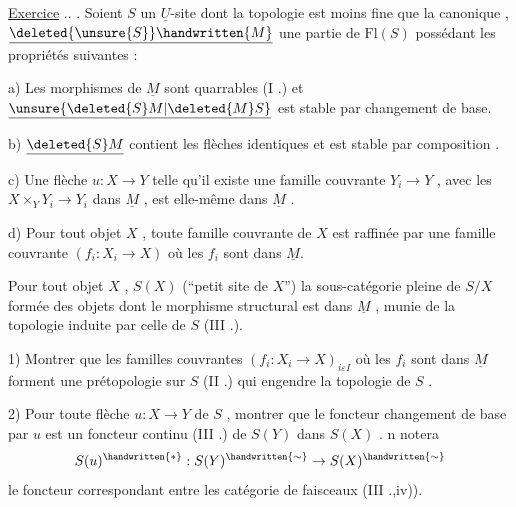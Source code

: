 \uline{Exercice} .. . Soient \(S\) un \(\underline{U}\)-site dont la topologie est moins fine que la canonique , \(\underline{\deleted{\unsure{S}}\handwritten{M}}\) une partie de \(\mathrm{Fl}(S)\) possédant les propriétés suivantes :

a) Les morphismes de \(\underline{M}\) sont quarrables (I .) et \(\underline{\unsure{\deleted{S}M|\deleted{M}S}}\) est stable par changement de base.

b) \(\underline{\deleted{S}M}\) contient les flèches identiques et est stable par composition .

c) Une flèche \(u:X\to Y\) telle qu'il existe une famille couvrante \(Y_i\to Y\) , avec les \(X\times_Y Y_i\to Y_i\) dans \(\underline{M}\) , est elle-même dans \(\underline{M}\) .

d) Pour tout objet \(X\) , toute famille couvrante de \(X\) est raffinée par une famille couvrante \((f_i:X_i\to X)\) où les \(f_i\) sont dans \(\underline{M}\).

Pour tout objet \(X\) ,  \(S(X)\) (``petit site de \(X\)'')
\reversemarginpar
{}
\normalmarginpar
{}
 la sous-catégorie pleine de \(S/X\) formée des objets dont le morphisme structural est dans \(\underline{M}\) , munie de la topologie induite par celle de \(S\) (III .).

1) Montrer que les familles couvrantes \((f_i:X_i\to X)_{i\varepsilon I}\) où les \(f_i\) sont dans \(\underline{M}\) forment une prétopologie sur \(S\) (II .) qui engendre la topologie de \(S\) .

2) Pour toute flèche \(u:X\to Y\) de \(S\) , montrer que le foncteur changement de base par \(u\) est un foncteur continu (III .) de \(S(Y)\) dans \(S(X)\) . n notera
\[
S(u)^{\handwritten{*}}:S(Y)^{\handwritten{\sim}}\to S(X)^{\handwritten{\sim}}
\]
le foncteur correspondant entre les catégorie de faisceaux (III .,iv)).

